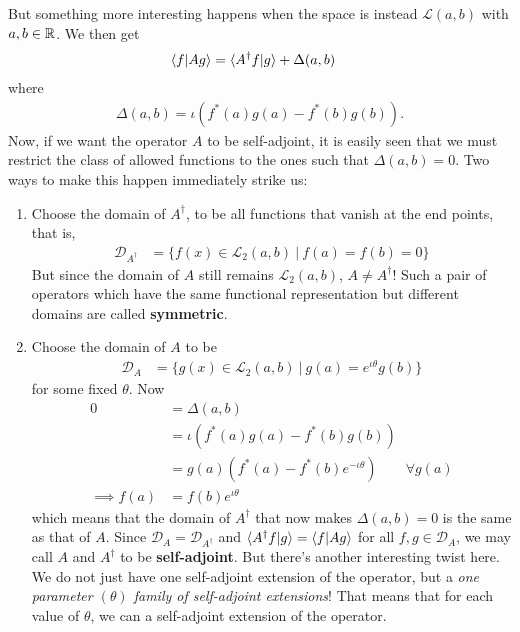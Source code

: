 But something more interesting happens when the space is instead $\mathcal L(a,b)$ with $a,b \in \mathbb{R}$. We then get
\begin{align*}
    \langle f|Ag\rangle &= \langle A^\dagger f |g \rangle + \Delta(a,b)
\end{align*}
where
\begin{align*}
    \Delta(a,b) = \iota(f^*(a)g(a) - f^*(b)g(b)).
\end{align*}
Now, if we want the operator $A$ to be self-adjoint, it is easily seen that we must restrict the class of allowed functions to the ones such that $\Delta(a,b)=0$. Two ways to make this happen immediately strike us:
\begin{enumerate}
    \item 
        Choose the domain of $A^\dagger$, to be all functions that vanish at the end points, that is,
        \begin{align*}
            \mathcal D_{A^\dagger} &= \{ f(x) \in \mathcal L_2(a,b)\ |\ f(a)=f(b)=0 \}
        \end{align*}
        But since the domain of $A$ still remains $\mathcal L_2(a,b)$, $A\neq A^\dagger$! Such a pair of operators which have the same functional representation but different domains are called \textbf{symmetric}.
    \item
        Choose the domain of $A$ to be
        \begin{align*}
            \mathcal D_{A} &= \{ g(x) \in \mathcal L_2(a,b)\ |\ g(a)=e^{\iota\theta} g(b) \}
        \end{align*}
        for some fixed $\theta$. Now 
        \begin{align*}
            0 &= \Delta(a,b) \\
            &= \iota(f^*(a)g(a) - f^*(b)g(b))  \\
            &= g(a) (f^*(a) - f^*(b) e^{-\iota\theta})  \quad \quad\forall g(a) \\
            \implies f(a) &= f(b) e^{\iota\theta}
        \end{align*}
        which means that the domain of $A^\dagger$ that now makes $\Delta(a,b)=0$ is the same as that of $A$. Since $\mathcal D_A = \mathcal D_{A^\dagger}$ and $\langle A^\dagger f|g\rangle = \langle f | A g\rangle$ for all $f,g \in \mathcal D_A$, we may call $A$ and $A^\dagger$ to be \textbf{self-adjoint}.
        But there's another interesting twist here. We do not just have one self-adjoint extension of the operator, but a \emph{one parameter $(\theta)$ family of self-adjoint extensions}! That means that for each value of $\theta$, we can a self-adjoint extension of the operator.
\end{enumerate}


